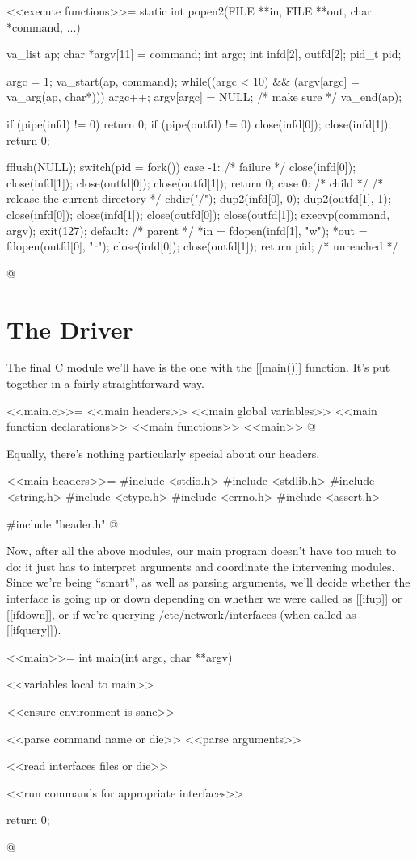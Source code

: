 \documentclass{article}
\begin{document}
<<execute functions>>=
static int popen2(FILE **in, FILE **out, char *command, ...) {
	va_list ap;
	char *argv[11] = {command};
	int argc;
	int infd[2], outfd[2];
	pid_t pid;

	argc = 1;
	va_start(ap, command);
	while((argc < 10) && (argv[argc] = va_arg(ap, char*))) {
		argc++;
	}
	argv[argc] = NULL; /* make sure */
	va_end(ap);

	if (pipe(infd) != 0) return 0;
	if (pipe(outfd) != 0) {
		close(infd[0]); close(infd[1]);
		return 0;
	}

	fflush(NULL);
	switch(pid = fork()) {
		case -1: /* failure */
			close(infd[0]); close(infd[1]);
			close(outfd[0]); close(outfd[1]);
			return 0;
		case 0: /* child */
			/* release the current directory */
			chdir("/");
			dup2(infd[0], 0);
			dup2(outfd[1], 1);
			close(infd[0]); close(infd[1]);
			close(outfd[0]); close(outfd[1]);
			execvp(command, argv);
			exit(127);
		default: /* parent */
			*in = fdopen(infd[1], "w");
			*out = fdopen(outfd[0], "r");
			close(infd[0]);	close(outfd[1]);
			return pid;
	}
	/* unreached */
}
@

\section{The Driver}

The final C module we'll have is the one with the [[main()]]
function. It's put together in a fairly straightforward way.

<<main.c>>=
<<main headers>>
<<main global variables>>
<<main function declarations>>
<<main functions>>
<<main>>
@ 

Equally, there's nothing particularly special about our headers.

<<main headers>>=
#include <stdio.h>
#include <stdlib.h>
#include <string.h>
#include <ctype.h>
#include <errno.h>
#include <assert.h>

#include "header.h"
@

Now, after all the above modules, our main program doesn't have too
much to do: it just has to interpret arguments and coordinate the
intervening modules. Since we're being ``smart'', as well as parsing
arguments, we'll decide whether the interface is going up or down
depending on whether we were called as [[ifup]] or [[ifdown]], or if we're
querying /etc/network/interfaces (when called as [[ifquery]]).

<<main>>=
int main(int argc, char **argv) {
	<<variables local to main>>

	<<ensure environment is sane>>

	<<parse command name or die>>
	<<parse arguments>>

	<<read interfaces files or die>>

	<<run commands for appropriate interfaces>>

	return 0;
}
@
\end{document}
